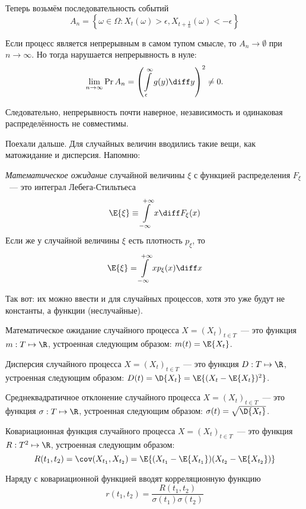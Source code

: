 Теперь возьмём последовательность событий
\[
	A_{n} = \left\{\omega \in \Omega : X_{t}(\omega) > \epsilon, X_{t + 
	\frac{1}{n}}(\omega) < -\epsilon\right\}
\]

Если процесс является непрерывным в самом тупом смысле, то \(A_n \to 
\emptyset\) при \(n \to \infty\). Но тогда нарушается непрерывность в нуле:
\[
	\lim\limits_{n \to \infty} \Pr{A_n} = 
	\left(\int\limits_{\epsilon}^{\infty}g(y)\diff y\right)^{2} \neq 0.
\]

Следовательно, непрерывность почти наверное, независимость и одинаковая 
распределённость не совместимы.

Поехали дальше. Для случайных величин вводились такие вещи, как матожидание и 
дисперсия. Напомню:
\begin{definition}
	\emph{Математическое ожидание} случайной величины \(\xi\) с функцией 
	распределения \(F_{\xi}\)~--- это интеграл Лебега-Стильтьеса
	\[
		\E{\xi} \equiv \int\limits_{-\infty}^{+\infty} x\diff F_{\xi}(x)
	\]
	Если же у случайной величины \(\xi\) есть плотность \(p_{\xi}\), то
	\[
		\E{\xi} = \int\limits_{-\infty}^{+\infty} xp_{\xi}(x)\diff x
	\] 
\end{definition}

Так вот: их можно ввести и для случайных процессов, хотя это уже будут не 
константы, а функции (неслучайные).
\begin{definition}
	Математическое ожидание случайного процесса \(X = (X_{t})_{t \in T}\)~--- 
	это функция \(m : T \mapsto \R\), устроенная следующим образом: \(m(t) = 
	\E{X_{t}}\).
\end{definition}
\begin{definition}
	Дисперсия случайного процесса \(X = (X_{t})_{t \in T}\)~--- 
	это функция \(D : T \mapsto \R\), устроенная следующим образом: \(D(t) = 
	\D{X_{t}} = \E{(X_{t} - \E{X_{t}})^{2}}\).
\end{definition}
\begin{definition}
	Среднеквадратичное отклонение случайного процесса \(X = (X_{t})_{t \in 
	T}\)~--- это функция \(\sigma : T \mapsto \R\), устроенная следующим 
	образом: \(\sigma(t) = \sqrt{\D{X_{t}}}\).
\end{definition}
\begin{definition}
	Ковариационная функция случайного процесса \(X = (X_{t})_{t \in T}\)~--- 
	это функция \(R : T^{2} \mapsto \R\), устроенная следующим образом: 
	\[
		R(t_{1}, t_{2}) = \cov(X_{t_{1}}, X_{t_{2}}) = \E{(X_{t_{1}} - 
		\E{X_{t_{1}}})(X_{t_{2}} - \E{X_{t_{2}}})}
	\]
\end{definition}
Наряду с ковариационной функцией вводят корреляционную функцию
\[
	r(t_{1}, t_{2}) = \frac{R(t_{1}, t_{2})}{\sigma(t_{1})\sigma(t_{2})}
\]

